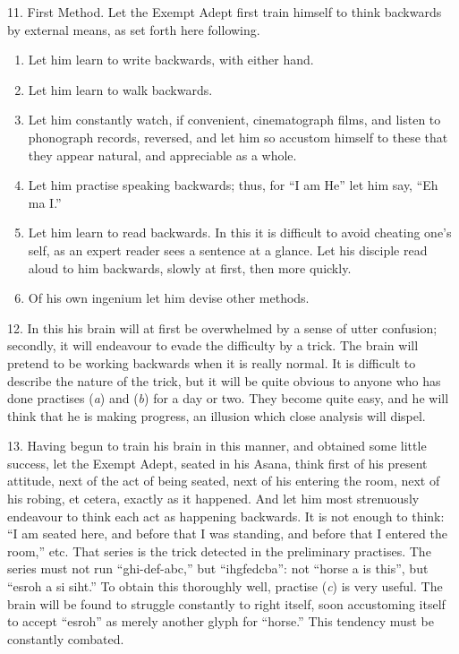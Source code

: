 11. First Method.  Let the Exempt Adept first train himself to think backwards by external means, as set forth here following.
\begin{enumerate}[label=(\alph*)]
\item Let him learn to write backwards, with either hand.
\item Let him learn to walk backwards.
\item Let him constantly watch, if convenient, cinematograph films, and listen to phonograph records, reversed, and let him so accustom himself to these that they appear natural, and appreciable as a whole.
\item Let him practise speaking backwards; thus, for \enquote{I am He} let him say, \enquote{Eh ma I.}
\item Let him learn to read backwards. In this it is difficult to avoid cheating one’s self, as an expert reader sees a sentence at a glance. Let his disciple read aloud to him backwards, slowly at first, then more quickly.
\item Of his own ingenium let him devise other methods.
\end{enumerate}

12. In this his brain will at first be overwhelmed by a sense of utter confusion; secondly, it will endeavour to evade the difficulty by a trick. The brain will pretend to be working backwards when it is really normal. It is difficult to describe the nature of the trick, but it will be quite obvious to anyone who has done practises (\textit{a}) and (\textit{b}) for a day or two. They become quite easy, and he will think that he is making progress, an illusion which close analysis will dispel.

13. Having begun to train his brain in this manner, and obtained some little success, let the Exempt Adept, seated in his Asana, think first of his present attitude, next of the act of being seated, next of his entering the room, next of his robing, et cetera, exactly as it happened. And let him most strenuously endeavour to think each act as happening backwards. It is not enough to think: \enquote{I am seated here, and before that I was standing, and before that I entered the room,} etc. That series is the trick detected in the preliminary practises.  The series must not run \mbox{\enquote{ghi-def-abc,}} but \mbox{\enquote{ihgfedcba}}: not \enquote{horse a is this}, but \enquote{esroh a si siht.} To obtain this thoroughly well, practise (\textit{c}) is very useful. The brain will be found to struggle constantly to right itself, soon accustoming itself to accept \enquote{esroh} as merely another glyph for \enquote{horse.} This tendency must be constantly combated.

